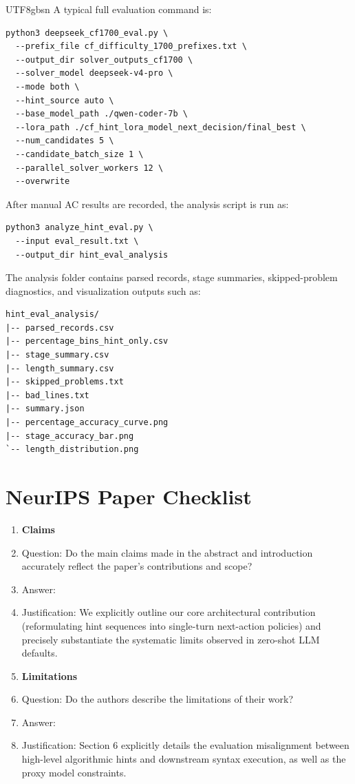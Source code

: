 \documentclass{article}
\begin{document}
\begin{CJK*}{UTF8}{gbsn}
A typical full evaluation command is:
\begin{verbatim}
python3 deepseek_cf1700_eval.py \
  --prefix_file cf_difficulty_1700_prefixes.txt \
  --output_dir solver_outputs_cf1700 \
  --solver_model deepseek-v4-pro \
  --mode both \
  --hint_source auto \
  --base_model_path ./qwen-coder-7b \
  --lora_path ./cf_hint_lora_model_next_decision/final_best \
  --num_candidates 5 \
  --candidate_batch_size 1 \
  --parallel_solver_workers 12 \
  --overwrite
\end{verbatim}

After manual AC results are recorded, the analysis script is run as:
\begin{verbatim}
python3 analyze_hint_eval.py \
  --input eval_result.txt \
  --output_dir hint_eval_analysis
\end{verbatim}

The analysis folder contains parsed records, stage summaries, skipped-problem diagnostics, and visualization outputs such as:
\begin{verbatim}
hint_eval_analysis/
|-- parsed_records.csv
|-- percentage_bins_hint_only.csv
|-- stage_summary.csv
|-- length_summary.csv
|-- skipped_problems.txt
|-- bad_lines.txt
|-- summary.json
|-- percentage_accuracy_curve.png
|-- stage_accuracy_bar.png
`-- length_distribution.png
\end{verbatim}

\newpage
{} 

\section*{NeurIPS Paper Checklist}

\begin{enumerate}

\item {\bf Claims}
    \item[] Question: Do the main claims made in the abstract and introduction accurately reflect the paper's contributions and scope?
    \item[] Answer: \answerYes{}
    \item[] Justification: We explicitly outline our core architectural contribution (reformulating hint sequences into single-turn next-action policies) and precisely substantiate the systematic limits observed in zero-shot LLM defaults.

\item {\bf Limitations}
    \item[] Question: Do the authors describe the limitations of their work?
    \item[] Answer: \answerYes{}
    \item[] Justification: Section 6 explicitly details the evaluation misalignment between high-level algorithmic hints and downstream syntax execution, as well as the proxy model constraints.


\end{enumerate}
\end{CJK*}
\end{document}
